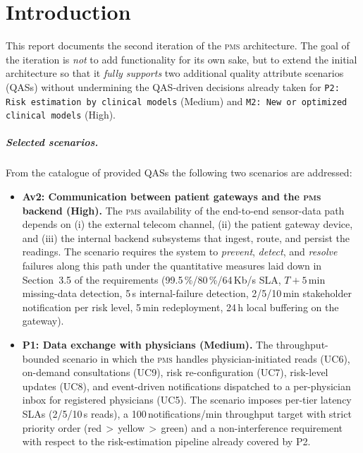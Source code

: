 
\chapter{Introduction}\label{sec:introduction}

This report documents the second iteration of the \textsc{pms} architecture.
The goal of the iteration is \emph{not} to add functionality for its own
sake, but to extend the initial architecture so that it \emph{fully supports}
two additional quality attribute scenarios (QASs) without undermining the
QAS-driven decisions already taken for \texttt{P2: Risk estimation by clinical
models} (Medium) and \texttt{M2: New or optimized clinical models} (High).

\paragraph{Selected scenarios.}
From the catalogue of provided QASs the following two scenarios are
addressed:
\begin{itemize}
  \item \textbf{Av2: Communication between patient gateways and the
        \textsc{pms} backend (High).}
        The \textsc{pms} availability of the end-to-end sensor-data path
        depends on (i) the external telecom channel, (ii) the patient
        gateway device, and (iii) the internal backend subsystems that
        ingest, route, and persist the readings. The scenario requires the
        system to \emph{prevent}, \emph{detect}, and \emph{resolve}
        failures along this path under the quantitative measures laid down
        in Section~3.5 of the requirements (99.5\,\%/80\,\%/64\,Kb/s SLA,
        $T{+}5$\,min missing-data detection, 5\,s internal-failure
        detection, 2/5/10\,min stakeholder notification per risk level,
        5\,min redeployment, 24\,h local buffering on the gateway).
  \item \textbf{P1: Data exchange with physicians (Medium).}
        The throughput-bounded scenario in which the \textsc{pms} handles
        physician-initiated reads (UC6), on-demand consultations (UC9), risk
        re-configuration (UC7), risk-level updates (UC8), and
        event-driven notifications dispatched to a per-physician inbox for
        registered physicians (UC5). The
        scenario imposes per-tier latency SLAs (2/5/10\,s reads), a
        100\,notifications/min throughput target with strict priority order
        (red\,$>$\,yellow\,$>$\,green) and a non-interference requirement
        with respect to the risk-estimation pipeline already covered by P2.
\end{itemize}

